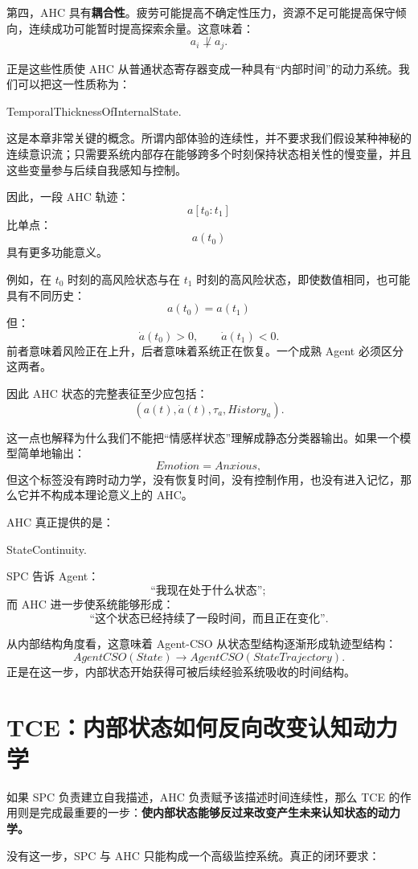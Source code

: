 第四，AHC 具有\textbf{耦合性}。疲劳可能提高不确定性压力，资源不足可能提高保守倾向，连续成功可能暂时提高探索余量。这意味着：
\[
a_i
\not\perp
a_j.
\]

正是这些性质使 AHC 从普通状态寄存器变成一种具有``内部时间''的动力系统。我们可以把这一性质称为：
\begin{statementbox}
TemporalThicknessOfInternalState.
\end{statementbox}

这是本章非常关键的概念。所谓内部体验的连续性，并不要求我们假设某种神秘的连续意识流；只需要系统内部存在能够跨多个时刻保持状态相关性的慢变量，并且这些变量参与后续自我感知与控制。

因此，一段 AHC 轨迹：
\[
a[t_0:t_1]
\]
比单点：
\[
a(t_0)
\]
具有更多功能意义。

例如，在 $t_0$ 时刻的高风险状态与在 $t_1$ 时刻的高风险状态，即使数值相同，也可能具有不同历史：
\[
a(t_0)=a(t_1)
\]
但：
\[
\dot a(t_0)>0,
\qquad
\dot a(t_1)<0.
\]
前者意味着风险正在上升，后者意味着系统正在恢复。一个成熟 Agent 必须区分这两者。

因此 AHC 状态的完整表征至少应包括：
\[
\boxed{
\left(
a(t),
\dot a(t),
\tau_a,
History_a
\right).
}
\]

这一点也解释为什么我们不能把``情感样状态''理解成静态分类器输出。如果一个模型简单地输出：
\[
Emotion=Anxious,
\]
但这个标签没有跨时动力学，没有恢复时间，没有控制作用，也没有进入记忆，那么它并不构成本理论意义上的 AHC。

AHC 真正提供的是：
\begin{statementbox}
StateContinuity.
\end{statementbox}
SPC 告诉 Agent：
\[
\text{``我现在处于什么状态''};
\]
而 AHC 进一步使系统能够形成：
\[
\text{``这个状态已经持续了一段时间，而且正在变化''}.
\]

从内部结构角度看，这意味着 Agent-CSO 从状态型结构逐渐形成轨迹型结构：
\[
AgentCSO(State)
\rightarrow
AgentCSO(StateTrajectory).
\]
正是在这一步，内部状态开始获得可被后续经验系统吸收的时间结构。

\section{TCE：内部状态如何反向改变认知动力学}

如果 SPC 负责建立自我描述，AHC 负责赋予该描述时间连续性，那么 TCE 的作用则是完成最重要的一步：\textbf{使内部状态能够反过来改变产生未来认知状态的动力学。}

没有这一步，SPC 与 AHC 只能构成一个高级监控系统。真正的闭环要求：
\begin{statementbox}
\centering
{}
\end{statementbox}

